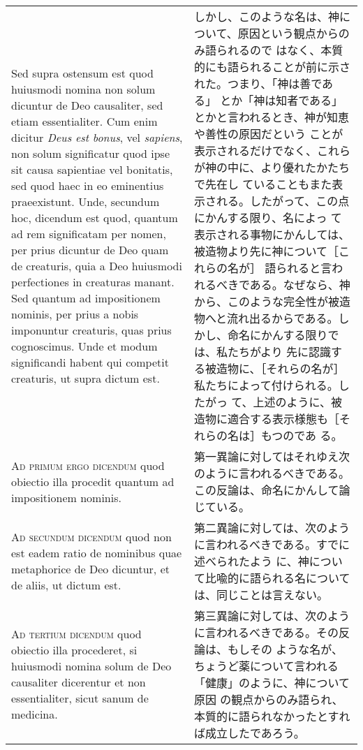 \documentclass[10pt]{jsarticle} %
\begin{document}
\begin{longtable}{p{21em}p{21em}}
\\


Sed supra ostensum est quod huiusmodi nomina non solum dicuntur de Deo
causaliter, sed etiam essentialiter. Cum enim dicitur {\itshape Deus
est bonus}, vel {\itshape sapiens}, non solum significatur quod ipse
sit causa sapientiae vel bonitatis, sed quod haec in eo eminentius
praeexistunt. Unde, secundum hoc, dicendum est quod, quantum ad rem
significatam per nomen, per prius dicuntur de Deo quam de creaturis,
quia a Deo huiusmodi perfectiones in creaturas manant. Sed quantum ad
impositionem nominis, per prius a nobis imponuntur creaturis, quas
prius cognoscimus. Unde et modum significandi habent qui competit
creaturis, ut supra dictum est.

&

しかし、このような名は、神について、原因という観点からのみ語られるので
はなく、本質的にも語られることが前に示された。つまり、「神は善である」
とか「神は知者である」とかと言われるとき、神が知恵や善性の原因だという
ことが表示されるだけでなく、これらが神の中に、より優れたかたちで先在し
ていることもまた表示される。したがって、この点にかんする限り、名によっ
て表示される事物にかんしては、被造物より先に神について［これらの名が］
語られると言われるべきである。なぜなら、神から、このような完全性が被造
物へと流れ出るからである。しかし、命名にかんする限りでは、私たちがより
先に認識する被造物に、［それらの名が］私たちによって付けられる。したがっ
て、上述のように、被造物に適合する表示様態も［それらの名は］もつのであ
る。


\\


{\scshape Ad primum ergo dicendum} quod obiectio illa
 procedit quantum ad impositionem nominis.

&


第一異論に対してはそれゆえ次のように言われるべきである。
この反論は、命名にかんして論じている。

\\


{\scshape Ad secundum dicendum} quod non est eadem ratio de nominibus
quae metaphorice de Deo dicuntur, et de aliis, ut dictum est.

&

第二異論に対しては、次のように言われるべきである。すでに述べられたよう
に、神について比喩的に語られる名については、同じことは言えない。

\\


{\scshape Ad tertium dicendum} quod obiectio illa procederet, si
huiusmodi nomina solum de Deo causaliter dicerentur et non
essentialiter, sicut sanum de medicina.

&

第三異論に対しては、次のように言われるべきである。その反論は、もしその
ような名が、ちょうど薬について言われる「健康」のように、神について原因
の観点からのみ語られ、本質的に語られなかったとすれば成立したであろう。


\end{longtable}
\newpage
{}
\end{document}
